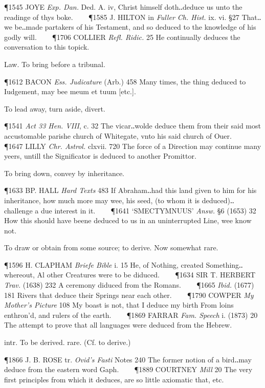 \begin{description}[wide, labelwidth=!, labelindent=0pt]
\begin{myenumerate}
\P 1545 JOYE  \textit{Exp. Dan.} Ded. A. iv, Christ himself doth‥deduce us unto the readinge of thys boke.    
\P 1585 J. HILTON in  \textit{Fuller Ch. Hist.} ix. vi. §27 That‥we be‥made partakers of his Testament, and so deduced to the knowledge of his godly will.    
\P 1706 COLLIER  \textit{Refl. Ridic.} 25 He continually deduces the conversation to this topick.

 Law. To bring before a tribunal.

\P 1612 BACON  \textit{Ess. Judicature} (Arb.) 458 Many times, the thing deduced to Iudgement, may bee meum et tuum [etc.].

 To lead away, turn aside, divert.

\P 1541  \textit{Act 33 Hen. VIII}, c. 32 The vicar‥wolde deduce them from their said most accustomable parishe church of Whitegate, vnto his said church of Ouer.    
\P 1647 LILLY  \textit{Chr. Astrol.} clxvii. 720 The force of a Direction may continue many yeers, untill the Significator is deduced to another Promittor.

 To bring down, convey by inheritance.

\P 1633 BP. HALL  \textit{Hard Texts} 483 If Abraham‥had this land given to him for his inheritance, how much more may wee, his seed, (to whom it is deduced)‥challenge a due interest in it.    
\P 1641 ‘SMECTYMNUUS’  \textit{Answ.} §6 (1653) 32 How this should have beene deduced to us in an uninterrupted Line, wee know not.

 To draw or obtain from some source; to derive. Now somewhat rare.

\P 1596 H. CLAPHAM  \textit{Briefe Bible} i. 15 He, of Nothing, created Something‥whereout, Al other Creatures were to be diduced.    
\P 1634 SIR T. HERBERT  \textit{Trav.} (1638) 232 A ceremony diduced from the Romans.    
\P 1665  \textit{Ibid.} (1677) 181 Rivers that deduce their Springs near each other.    
\P 1790 COWPER  \textit{My Mother's Picture} 108 My boast is not, that I deduce my birth From loins enthron'd, and rulers of the earth.    
\P 1869 FARRAR  \textit{Fam. Speech} i. (1873) 20 The attempt to prove that all languages were deduced from the Hebrew.

 intr. To be derived. rare. (Cf. to derive.)

\P 1866 J. B. ROSE tr. \textit{Ovid's Fasti} Notes 240 The former notion of a bird‥may deduce from the eastern word Gaph.    
\P 1889 COURTNEY  \textit{Mill} 20 The very first principles from which it deduces, are so little axiomatic that, etc.


\end{myenumerate}
\end{description}
